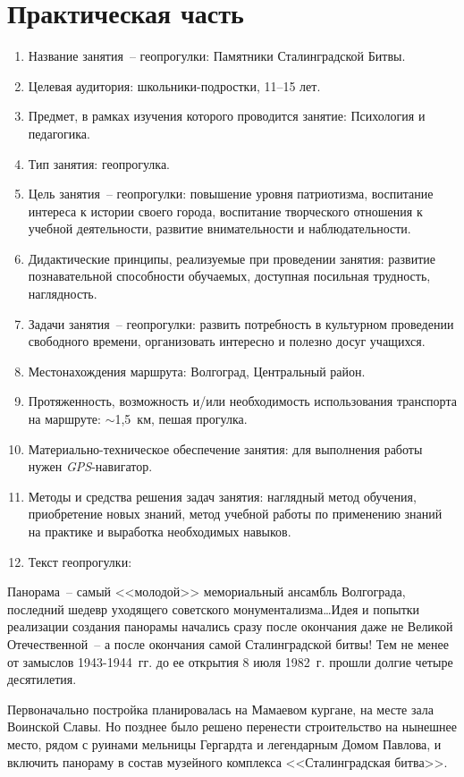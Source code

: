 \section*{Практическая часть}
\begin{enumerate}
  \item Название занятия~-- геопрогулки: Памятники Сталинградской Битвы.
  \item Целевая аудитория: школьники-подростки, 11--15 лет.
  \item Предмет, в рамках изучения которого проводится занятие: Психология и
    педагогика.
  \item Тип занятия: геопрогулка.
  \item Цель занятия~-- геопрогулки: повышение уровня патриотизма, воспитание
    интереса к истории своего города, воспитание творческого отношения к учебной
    деятельности, развитие внимательности и наблюдательности.
  \item Дидактические принципы, реализуемые при проведении занятия: развитие
    познавательной способности обучаемых, доступная посильная трудность,
    наглядность.
  \item Задачи занятия~-- геопрогулки: развить потребность в культурном
    проведении свободного времени, организовать интересно и полезно досуг
    учащихся.
  \item Местонахождения маршрута: Волгоград, Центральный район.
  \item Протяженность, возможность и/или необходимость использования транспорта
    на маршруте: \( \sim \)1,5~км, пешая прогулка.
  \item Материально-техническое обеспечение занятия: для выполнения работы нужен
    \emph{GPS}-навигатор.
  \item Методы и средства решения задач занятия: наглядный метод обучения,
    приобретение новых знаний, метод учебной работы по применению знаний на
    практике и выработка необходимых навыков.
  \item Текст геопрогулки:
\end{enumerate}

Панорама~-- самый <<молодой>> мемориальный ансамбль Волгограда, последний
шедевр уходящего советского монументализма\ldots Идея и попытки реализации
создания панорамы начались сразу после окончания даже не Великой
Отечественной~-- а после окончания самой Сталинградской битвы! Тем не менее от
замыслов 1943-1944~гг. до ее открытия 8 июля 1982~г. прошли долгие четыре
десятилетия.

Первоначально постройка планировалась на Мамаевом кургане, на месте зала
Воинской Славы. Но позднее было решено перенести строительство на нынешнее
место, рядом с руинами мельницы Гергардта и легендарным Домом Павлова, и
включить панораму в состав музейного комплекса <<Сталинградская битва>>.

